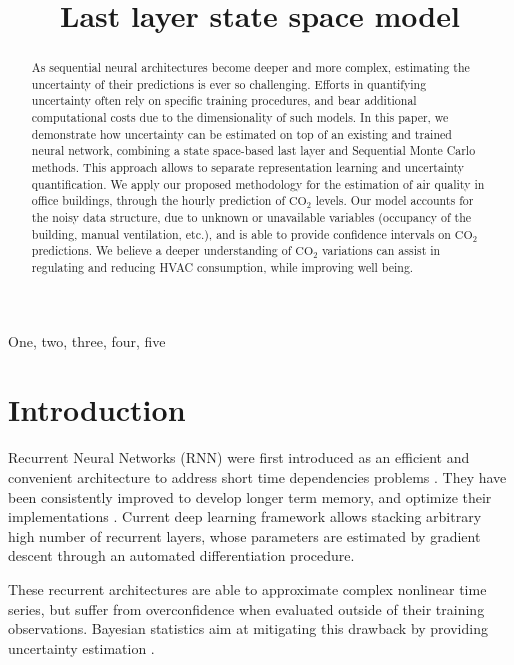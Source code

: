 \documentclass{article}
\title{Last layer state space model}
\begin{document}
\maketitle

\begin{abstract}
	As sequential neural architectures become deeper and more complex, estimating the uncertainty of their predictions is ever so challenging.
	Efforts in quantifying uncertainty often rely on specific training procedures, and bear additional computational costs due to the dimensionality of such models.
	In this paper, we demonstrate how uncertainty can be estimated on top of an existing and trained neural network, combining a state space-based last  layer and  Sequential Monte Carlo methods. This approach allows to separate representation learning and uncertainty quantification. We apply our proposed methodology for the estimation of air quality in office buildings, through the hourly prediction of \ensuremath{\mathrm{CO_2}} levels.
	Our model accounts for the noisy data structure, due to unknown or unavailable variables (occupancy of the building, manual ventilation, etc.), and is able to provide confidence intervals on \ensuremath{\mathrm{CO_2}} predictions.
	We believe a deeper understanding of \ensuremath{\mathrm{CO_2}} variations can assist in regulating and reducing HVAC consumption, while improving well being.
\end{abstract}

\begin{keywords}
	One, two, three, four, five
\end{keywords}

\section{Introduction}
\label{sec:intro}

Recurrent Neural Networks (RNN) were first introduced as an efficient and convenient architecture to address short time dependencies problems \cite{Mozer1989AFB}.
They have been consistently improved to develop longer term memory, and optimize their implementations \cite{Bengio1994LearningLD,Hochreiter1997LongSM,Cho2014LearningPR}.
Current deep learning framework allows stacking arbitrary high number of recurrent layers, whose parameters are estimated by gradient descent through an automated differentiation procedure.

These recurrent architectures are able to approximate complex nonlinear time series, but suffer from overconfidence when evaluated outside of their training observations. Bayesian statistics aim at mitigating this drawback by providing uncertainty estimation \cite{Hinton1995BayesianLF,MacKay1992}.
\end{document}
